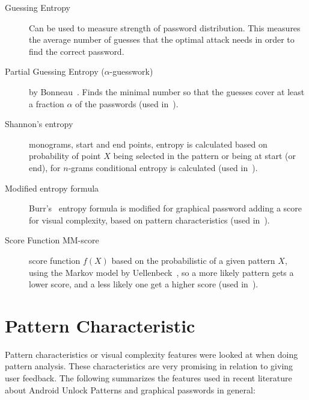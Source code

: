 \documentclass[twocolumn, a4paper, 10pt]{article}
\begin{document}
\begin{description}
	\item[Guessing Entropy] Can be used to measure strength of password distribution. This measures the average number of guesses that the optimal attack needs in order to find the correct password.~\cite{massey1994guessing}
	
	\item[Partial Guessing Entropy ($\alpha$-guesswork)] by Bonneau~\cite{Bonneau:2012:QRP:2310656.2310722}. Finds the minimal number so that the guesses cover at least a fraction $\alpha$ of the passwords (used in~\cite{Uellenbeck:2013:QSG:2508859.2516700}).
	
	\item[Shannon's entropy] monograms, start and end points, entropy is calculated based on probability of point $X$ being selected in the pattern or being at start (or end), for $n$-grams conditional entropy is calculated (used in~\cite{Aviv:2014:UVP:2664243.2664253}).
	
	\item[Modified entropy formula] Burr's~\cite{burr2004electronic} entropy formula is modified for graphical password adding a score for visual complexity,  based on pattern characteristics (used in~\cite{Sun2014308}).
	
	\item[Score Function MM-score] score function $f(X)$ based on the probabilistic of a given pattern $X$, using the Markov model by Uellenbeck~\cite{Uellenbeck:2013:QSG:2508859.2516700}, so a more likely pattern gets a lower score, and a less likely one get a higher score (used in~\cite{siadati2015fortifying}).
\end{description}


\section{Pattern Characteristic}
\label{sec:characteristics}

Pattern characteristics or visual complexity features were looked at when doing pattern analysis. These characteristics are very promising in relation to giving user feedback. The following summarizes the features used in recent literature about Android Unlock Patterns and graphical passwords in general:
\end{document}
